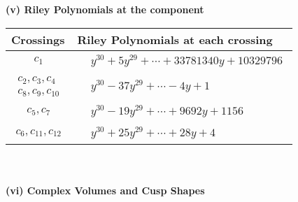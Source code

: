 \documentclass[1p]{elsarticle_modified}
\theoremstyle{definition}
\begin{document}
\newpage\renewcommand{\arraystretch}{1}
\flushleft \textbf{(v) Riley Polynomials at the component}\newline \\
\begin{tabular}{m{50pt}|m{274pt}}
Crossings & \hspace{64pt}Riley Polynomials at each crossing \\
\hline $$\begin{aligned}c_{1}\end{aligned}$$&$\begin{aligned}
&y^{30}+5 y^{29}+\cdots+33781340 y+10329796
\end{aligned}$\\
\hline $$\begin{aligned}c_{2},c_{3},c_{4}\\c_{8},c_{9},c_{10}\end{aligned}$$&$\begin{aligned}
&y^{30}-37 y^{29}+\cdots-4 y+1
\end{aligned}$\\
\hline $$\begin{aligned}c_{5},c_{7}\end{aligned}$$&$\begin{aligned}
&y^{30}-19 y^{29}+\cdots+9692 y+1156
\end{aligned}$\\
\hline $$\begin{aligned}c_{6},c_{11},c_{12}\end{aligned}$$&$\begin{aligned}
&y^{30}+25 y^{29}+\cdots+28 y+4
\end{aligned}$\\
\hline
\end{tabular}\\~\\
\newpage\flushleft \textbf{(vi) Complex Volumes and Cusp Shapes}
\end{document}
